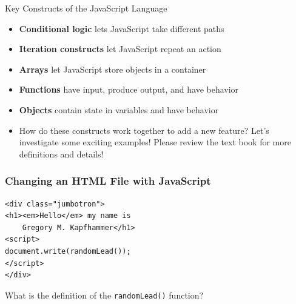 \documentclass[14pt,aspectratio=169]{beamer}
\begin{document}
%
\begin{frame}{Key Constructs of the JavaScript Language}
  \begin{itemize}
    \item {\bf Conditional logic} lets JavaScript take different paths
      \vspace*{-.15in}
    \item {\bf Iteration constructs} let JavaScript repeat an action
      \vspace*{-.15in}
    \item {\bf Arrays} let JavaScript store objects in a container
      \vspace*{-.15in}
    \item {\bf Functions} have input, produce output, and have behavior
      \vspace*{-.15in}
    \item {\bf Objects} contain state in variables and have behavior
      \vspace*{-.15in}
    \item How do these constructs work together to add a new feature? Let's
      investigate some exciting examples! Please review the text book for more
      definitions and details!
      \vspace*{-.15in}
  \end{itemize}
\end{frame}

%
\begin{frame}[fragile]
  \frametitle{Changing an HTML File with JavaScript}
  \normalsize
  \begin{minipage}{6in}
    \vspace*{.2in}
    \begin{verbatim}
<div class="jumbotron">
<h1><em>Hello</em> my name is
    Gregory M. Kapfhammer</h1>
<script>
document.write(randomLead());
</script>
</div>
    \end{verbatim}
  \end{minipage}
  \vspace*{.1in}
  \begin{center}
    What is the definition of the {\tt randomLead()} function?
  \end{center}
\end{frame}
\end{document}
